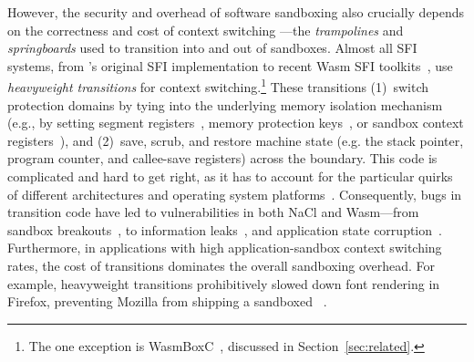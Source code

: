 However, the security and overhead of software sandboxing also
crucially depends on the correctness and cost of context switching 
\dash---the \emph{trampolines} and \emph{springboards} used 
to transition into and out of sandboxes.
%
Almost all SFI systems, from \cite{wahbe_efficient_1993}'s original
SFI implementation to recent Wasm SFI toolkits~\cite{lucet,
wamr}, use \emph{heavyweight transitions} for context switching.\footnote{The
one exception is WasmBoxC~\cite{wasmboxc}, discussed in
Section~\ref{sec:related}.}
%
These transitions (1)~switch protection domains 
by tying into the underlying memory isolation mechanism 
(e.g., by setting segment registers~\cite{yee_native_2009}, 
memory protection keys~\cite{vahldiek-oberwagner_erim_2019, hodor}, 
or sandbox context registers~\cite{lucet, wamr}), and 
%
(2)~save, scrub, and restore machine state (e.g. 
the stack pointer, program counter, and callee-save registers) 
across the boundary.
%
This code is complicated and hard to get right, as it has to 
account for the particular quirks of different architectures 
and operating system platforms~\cite{alder2020faulty}.
%
Consequently, bugs in transition code have led to
vulnerabilities in both NaCl and Wasm\dash---from sandbox
breakouts~\cite{nacl-bug-1607, nacl-bug-1633}, to information
leaks~\cite{nacl-bug-775, nacl-bug-2919}, and application state
corruption~\cite{cranelift-bug-1177}.
%
Furthermore, in applications with high application-sandbox 
context switching rates, the cost of transitions
dominates the overall sandboxing overhead.
%
For example, heavyweight transitions prohibitively slowed 
down font rendering in Firefox, preventing Mozilla from 
shipping a sandboxed \libgraphite~\cite{rlbox}.


